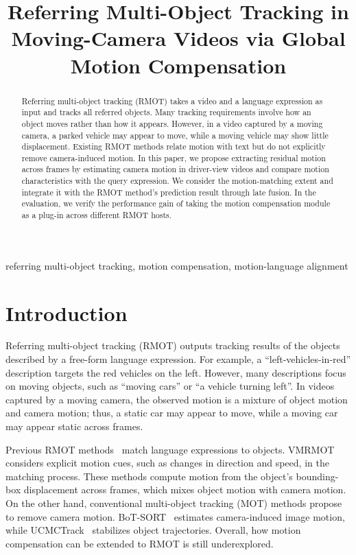 \documentclass{article}
\title{Referring Multi-Object Tracking in Moving-Camera Videos via Global Motion Compensation}
\begin{document}
\ninept
%
\maketitle
%
\begin{abstract}
Referring multi-object tracking (RMOT) takes a video and a language expression as input and tracks all referred objects. Many tracking requirements involve how an object moves rather than how it appears. However, in a video captured by a moving camera, a parked vehicle may appear to move, while a moving vehicle may show little displacement. Existing RMOT methods relate motion with text but do not explicitly remove camera-induced motion. In this paper, we propose extracting residual motion across frames by estimating camera motion in driver-view videos and compare motion characteristics with the query expression. We consider the motion-matching extent and integrate it with the RMOT method's prediction result through late fusion. In the evaluation, we verify the performance gain of taking the motion compensation module as a plug-in across different RMOT hosts. %
\end{abstract}
%
\begin{keywords}
referring multi-object tracking, motion compensation, motion-language alignment
\end{keywords}


\section{Introduction}
\label{sec:intro}
Referring multi-object tracking (RMOT) outputs tracking results of the objects described by a free-form language expression. For example, a \enquote{left-vehicles-in-red} description targets the red vehicles on the left. However, many descriptions focus on moving objects, such as \enquote{moving cars} or \enquote{a vehicle turning left}. In videos captured by a moving camera, the observed motion is a mixture of object motion and camera motion; thus, a static car may appear to move, while a moving car may appear static across frames.

Previous RMOT methods~\cite{transrmot,ikun,flexhook} match language expressions to objects. VMRMOT~\cite{vmrmot} considers explicit motion cues, such as changes in direction and speed, in the matching process. These methods compute motion from the object's bounding-box displacement across frames, which mixes object motion with camera motion. On the other hand, conventional multi-object tracking (MOT) methods propose to remove camera motion. BoT-SORT~\cite{botsort} estimates camera-induced image motion, while UCMCTrack~\cite{ucmctrack} stabilizes object trajectories. Overall, how motion compensation can be extended to RMOT is still underexplored. 
\end{document}
